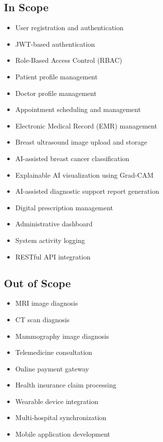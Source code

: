 \documentclass[12pt,a4paper]{report}
\begin{document}
\subsection*{In Scope}
\begin{itemize}[noitemsep]
    \item User registration and authentication
    \item JWT-based authentication
    \item Role-Based Access Control (RBAC)
    \item Patient profile management
    \item Doctor profile management
    \item Appointment scheduling and management
    \item Electronic Medical Record (EMR) management
    \item Breast ultrasound image upload and storage
    \item AI-assisted breast cancer classification
    \item Explainable AI visualization using Grad-CAM
    \item AI-assisted diagnostic support report generation
    \item Digital prescription management
    \item Administrative dashboard
    \item System activity logging
    \item RESTful API integration
\end{itemize}

\subsection*{Out of Scope}
\begin{itemize}[noitemsep]
    \item MRI image diagnosis
    \item CT scan diagnosis
    \item Mammography image diagnosis
    \item Telemedicine consultation
    \item Online payment gateway
    \item Health insurance claim processing
    \item Wearable device integration
    \item Multi-hospital synchronization
    \item Mobile application development
\end{itemize}
\end{document}
